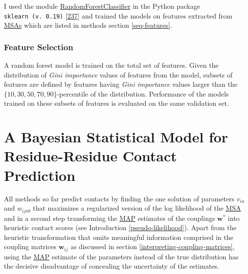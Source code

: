 \documentclass[11pt,a4paper,twoside]{book}
\newcommand{\via}{v_{ia}}
\newcommand{\w}{\mathbf{w}}
\newcommand{\wij}{\mathbf{w}_{ij}}
\newcommand{\wijab}{w_{ijab}}
\theoremstyle{definition}
\theoremstyle{definition}
\theoremstyle{remark}
\begin{document}
I used the module
\href{http://scikit-learn.org/stable/modules/generated/sklearn.ensemble.RandomForestClassifier.html\#sklearn.ensemble.RandomForestClassifier}{RandomForestClassifier}
in the Python package \texttt{sklearn\ (v.\ 0.19)}
{[}\protect\hyperlink{ref-Pedregosa2011}{237}{]} and trained the models
on features extracted from \protect\hyperlink{abbrev}{MSAs} which are
listed in methods section \ref{seq-features}.

\subsection{Feature Selection}\label{rf-feature-selection}

A random forest model is trained on the total set of features. Given the
distribution of \emph{Gini importance} values of features from the
model, subsets of features are defined by features having \emph{Gini
importance} values larger than the \(\{10, 30, 50, 70, 90\}\)-percentile
of the distribution. Performance of the models trained on these subsets
of features is evaluated on the same validation set.

\chapter{A Bayesian Statistical Model for Residue-Residue Contact
Prediction}\label{bayesian-approach}

All methods so far predict contacts by finding the one solution of
parameters \(\via\) and \(\wijab\) that maximizes a regularized version
of the log likelihood of the \protect\hyperlink{abbrev}{MSA} and in a
second step transforming the \protect\hyperlink{abbrev}{MAP} estimates
of the couplings \(\w^*\) into heuristic contact scores (see
Introduction \ref{pseudo-likelihood}). Apart from the heuristic
transformation that omits meaningful information comprised in the
coupling matrices \(\wij\) as discussed in section
\ref{interpreting-coupling-matrices}, using the
\protect\hyperlink{abbrev}{MAP} estimate of the parameters instead of
the true distribution has the decisive disadvantage of concealing the
uncertainty of the estimates.
\end{document}
